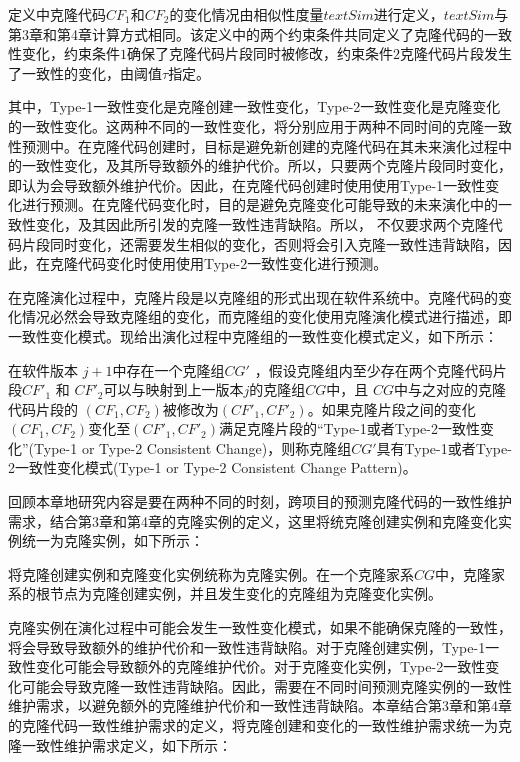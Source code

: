 定义中克隆代码$ CF_1 $和$ CF_2 $的变化情况由相似性度量$ \mathit {textSim} $进行定义，$textSim$与第3章和第4章计算方式相同。该定义中的两个约束条件共同定义了克隆代码的一致性变化，约束条件$1$确保了克隆代码片段同时被修改，约束条件$2$克隆代码片段发生了一致性的变化，由阈值$\tau$指定。

其中，Type-1一致性变化是克隆创建一致性变化，Type-2一致性变化是克隆变化的一致性变化。这两种不同的一致性变化，将分别应用于两种不同时间的克隆一致性预测中。在克隆代码创建时，目标是避免新创建的克隆代码在其未来演化过程中的一致性变化，及其所导致额外的维护代价。所以，只要两个克隆片段同时变化，即认为会导致额外维护代价。因此，在克隆代码创建时使用使用Type-1一致性变化进行预测。在克隆代码变化时，目的是避免克隆变化可能导致的未来演化中的一致性变化，及其因此所引发的克隆一致性违背缺陷。所以， 不仅要求两个克隆代码片段同时变化，还需要发生相似的变化，否则将会引入克隆一致性违背缺陷，因此，在克隆代码变化时使用使用Type-2一致性变化进行预测。

在克隆演化过程中，克隆片段是以克隆组的形式出现在软件系统中。克隆代码的变化情况必然会导致克隆组的变化，而克隆组的变化使用克隆演化模式进行描述，即一致性变化模式。现给出演化过程中克隆组的一致性变化模式定义，如下所示：

\begin{definition}[克隆一致性变化模式] 
\label{def-pattern}
在软件版本 $j+1$中存在一个克隆组$CG'$ ，假设克隆组内至少存在两个克隆代码片段$CF'_1$ 和 $CF'_2$可以与映射到上一版本$j$的克隆组$CG$中，且 $CG$中与之对应的克隆代码片段的 $(CF_1,CF_2)$被修改为$(CF'_1,CF'_2)$。如果克隆片段之间的变化 $(CF_1,CF_2)$变化至$(CF'_1,CF'_2)$满足克隆片段的“Type-1或者Type-2一致性变化”(Type-1 or Type-2 Consistent Change)，则称克隆组$CG'$具有Type-1或者Type-2一致性变化模式(Type-1 or  Type-2 Consistent Change Pattern)。
\end{definition}

回顾本章地研究内容是要在两种不同的时刻，跨项目的预测克隆代码的一致性维护需求，结合第3章和第4章的克隆实例的定义，这里将统克隆创建实例和克隆变化实例统一为克隆实例，如下所示：

\begin{definition}[克隆实例] 
\label{def-instance}
将克隆创建实例和克隆变化实例统称为克隆实例。在一个克隆家系$CG$中，克隆家系的根节点为克隆创建实例，并且发生变化的克隆组为克隆变化实例。
\end{definition}

克隆实例在演化过程中可能会发生一致性变化模式，如果不能确保克隆的一致性，将会导致导致额外的维护代价和一致性违背缺陷。对于克隆创建实例，Type-1一致性变化可能会导致额外的克隆维护代价。对于克隆变化实例，Type-2一致性变化可能会导致克隆一致性违背缺陷。因此，需要在不同时间预测克隆实例的一致性维护需求，以避免额外的克隆维护代价和一致性违背缺陷。本章结合第3章和第4章的克隆代码一致性维护需求的定义，将克隆创建和变化的一致性维护需求统一为克隆一致性维护需求定义，如下所示：


